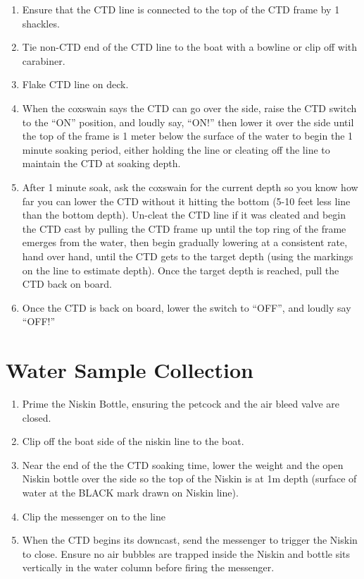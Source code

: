 \documentclass[]{book}
\providecommand{\tightlist}{%
  \setlength{\itemsep}{0pt}\setlength{\parskip}{0pt}}
\begin{document}
\begin{enumerate}
\def\labelenumi{\arabic{enumi}.}
\tightlist
\item
  Ensure that the CTD line is connected to the top of the CTD frame by 1
  shackles.
\item
  Tie non-CTD end of the CTD line to the boat with a bowline or clip off
  with carabiner.
\item
  Flake CTD line on deck.
\item
  When the coxswain says the CTD can go over the side, raise the CTD
  switch to the ``ON'' position, and loudly say, ``ON!'' then lower it
  over the side until the top of the frame is 1 meter below the surface
  of the water to begin the 1 minute soaking period, either holding the
  line or cleating off the line to maintain the CTD at soaking depth.
\item
  After 1 minute soak, ask the coxswain for the current depth so you
  know how far you can lower the CTD without it hitting the bottom (5-10
  feet less line than the bottom depth). Un-cleat the CTD line if it was
  cleated and begin the CTD cast by pulling the CTD frame up until the
  top ring of the frame emerges from the water, then begin gradually
  lowering at a consistent rate, hand over hand, until the CTD gets to
  the target depth (using the markings on the line to estimate depth).
  Once the target depth is reached, pull the CTD back on board.
\item
  Once the CTD is back on board, lower the switch to ``OFF'', and loudly
  say ``OFF!''
\end{enumerate}

\section{Water Sample Collection}\label{water-sample-collection}

\begin{enumerate}
\def\labelenumi{\arabic{enumi}.}
\tightlist
\item
  Prime the Niskin Bottle, ensuring the petcock and the air bleed valve
  are closed.
\item
  Clip off the boat side of the niskin line to the boat.
\item
  Near the end of the the CTD soaking time, lower the weight and the
  open Niskin bottle over the side so the top of the Niskin is at 1m
  depth (surface of water at the BLACK mark drawn on Niskin line).
\item
  Clip the messenger on to the line
\item
  When the CTD begins its downcast, send the messenger to trigger the
  Niskin to close. Ensure no air bubbles are trapped inside the Niskin
  and bottle sits vertically in the water column before firing the
  messenger.
\end{enumerate}
\end{document}
